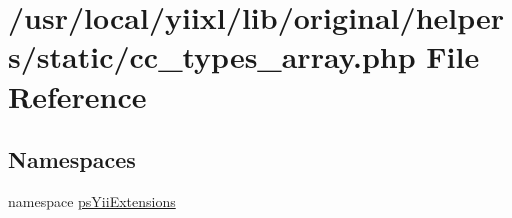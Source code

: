 \hypertarget{cc__types__array_8php}{
\section{/usr/local/yiixl/lib/original/helpers/static/cc\_\-types\_\-array.php File Reference}
\label{cc__types__array_8php}
}
\subsection*{Namespaces}
\begin{DoxyCompactItemize}
\item 
namespace \hyperlink{namespacepsYiiExtensions}{psYiiExtensions}
\end{DoxyCompactItemize}

